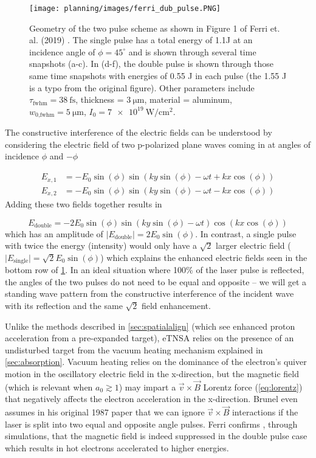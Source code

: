 \begin{figure}
	\centering 
	\texttt{[image: planning/images/ferri\_dub\_pulse.PNG]}
	\caption{Geometry of the two pulse scheme as shown in Figure 1 of Ferri et. al. (2019) \cite{Ferri_2019_Nat_Comm}. The single pulse has a total energy of 1.1J at an incidence angle of $\phi=45^\circ$ and is shown through several time snapshots (a-c). In (d-f), the double pulse is shown through those same time snapshots with energies of 0.55 J in each pulse (the 1.55 J is a typo from the original figure). Other parameters include $\tau_\text{fwhm} = \SI{38}{\femto \second}$, thickness = $\SI{3}{\micro \meter}$, material = aluminum, $w_\text{0,fwhm} = \SI{5}{\micro \meter}$, $I_0 = \SI{7e19}{\watt \per \centi \meter \squared}$.}
	\label{fig:ferri_dub_pulse}
\end{figure}
The constructive interference of the electric fields can be understood by considering the electric field of two p-polarized plane waves coming in at angles of incidence $\phi$ and $-\phi$

\begin{align}
	E_{x,1} &= -E_0 \sin(\phi) \sin(k y \sin(\phi) - \omega t + k x \cos(\phi)) \\
	E_{x,2} &= -E_0 \sin(\phi) \sin(k y \sin(\phi) - \omega t - k x \cos(\phi))
\end{align}
Adding these two fields together results in 

\begin{equation}
	E_\text{double} = -2 E_0 \sin(\phi) \sin(k y \sin(\phi) - \omega t) \cos(k x \cos(\phi))
\end{equation}
which has an amplitude of $\lvert E_\text{double} \rvert = 2 E_0 \sin(\phi)$. In contrast, a single pulse with twice the energy (intensity) would only have a $\sqrt{2}$ larger electric field ($\lvert E_\text{single} \rvert = \sqrt{2} E_0 \sin(\phi)$) which explains the enhanced electric fields seen in the bottom row of \cref{fig:ferri_dub_pulse}. In an ideal situation where 100\% of the laser pulse is reflected, the angles of the two pulses do not need to be equal and opposite -- we will get a standing wave pattern from the constructive interference of the incident wave with its reflection and the same $\sqrt{2}$ field enhancement.  

Unlike the methods described in \cref{sec:spatialalign} (which see enhanced proton acceleration from a pre-expanded target), \gls{eTNSA} relies on the presence of an undisturbed target from the vacuum heating mechanism \cite{Brunel_1987_PRL} explained in \cref{sec:absorption}. Vacuum heating relies on the dominance of the electron's quiver motion in the oscillatory electric field in the x-direction, but the magnetic field (which is relevant when $a_0 \gtrsim 1$) may impart a $\vec{v} \times \vec{B}$ Lorentz force (\cref{eq:lorentz}) that negatively affects the electron acceleration in the x-direction. Brunel even assumes in his original 1987 paper \cite{Brunel_1987_PRL} that we can ignore $\vec{v} \times \vec{B}$ interactions if the laser is split into two equal and opposite angle pulses. Ferri confirms \cite{Ferri_2019_Nat_Comm}, through simulations, that the magnetic field is indeed suppressed in the double pulse case which results in hot electrons accelerated to higher energies. 

